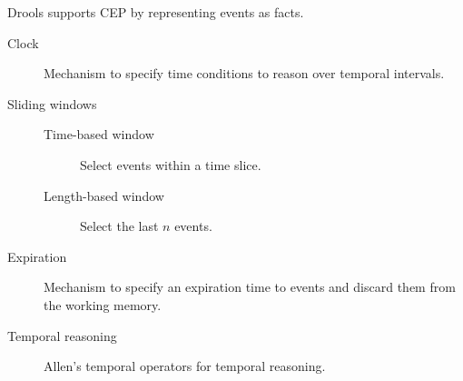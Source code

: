 Drools supports CEP by representing events as facts.

\begin{description}
    \item[Clock]
        Mechanism to specify time conditions to reason over temporal intervals.

    \item[Sliding windows] \phantom{}
        \begin{description} 
            \item[Time-based window] Select events within a time slice. 
            \item[Length-based window] Select the last $n$ events.
        \end{description}

    \item[Expiration]
        Mechanism to specify an expiration time to events and discard them from the working memory.

    \item[Temporal reasoning]
        Allen's temporal operators for temporal reasoning.
\end{description}